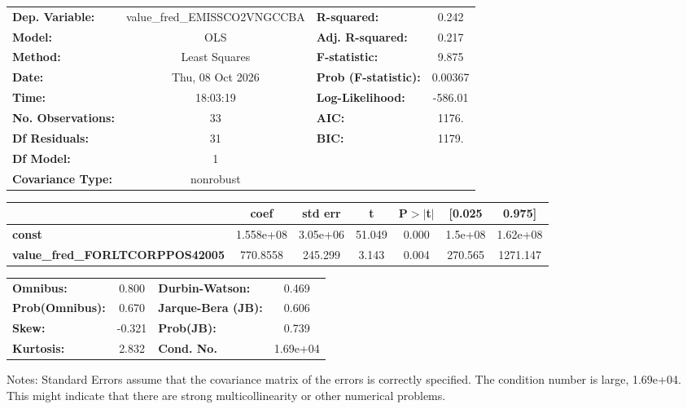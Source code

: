 \begin{center}
\begin{tabular}{lclc}
\toprule
\textbf{Dep. Variable:}                 & value\_fred\_EMISSCO2VNGCCBA & \textbf{  R-squared:         } &     0.242   \\
\textbf{Model:}                         &             OLS              & \textbf{  Adj. R-squared:    } &     0.217   \\
\textbf{Method:}                        &        Least Squares         & \textbf{  F-statistic:       } &     9.875   \\
\textbf{Date:}                          &       Thu, 08 Oct 2026       & \textbf{  Prob (F-statistic):} &  0.00367    \\
\textbf{Time:}                          &           18:03:19           & \textbf{  Log-Likelihood:    } &   -586.01   \\
\textbf{No. Observations:}              &                33            & \textbf{  AIC:               } &     1176.   \\
\textbf{Df Residuals:}                  &                31            & \textbf{  BIC:               } &     1179.   \\
\textbf{Df Model:}                      &                 1            & \textbf{                     } &             \\
\textbf{Covariance Type:}               &          nonrobust           & \textbf{                     } &             \\
\bottomrule
\end{tabular}
\begin{tabular}{lcccccc}
                                        & \textbf{coef} & \textbf{std err} & \textbf{t} & \textbf{P$> |$t$|$} & \textbf{[0.025} & \textbf{0.975]}  \\
\midrule
\textbf{const}                          &    1.558e+08  &     3.05e+06     &    51.049  &         0.000        &      1.5e+08    &     1.62e+08     \\
\textbf{value\_fred\_FORLTCORPPOS42005} &     770.8558  &      245.299     &     3.143  &         0.004        &      270.565    &     1271.147     \\
\bottomrule
\end{tabular}
\begin{tabular}{lclc}
\textbf{Omnibus:}       &  0.800 & \textbf{  Durbin-Watson:     } &    0.469  \\
\textbf{Prob(Omnibus):} &  0.670 & \textbf{  Jarque-Bera (JB):  } &    0.606  \\
\textbf{Skew:}          & -0.321 & \textbf{  Prob(JB):          } &    0.739  \\
\textbf{Kurtosis:}      &  2.832 & \textbf{  Cond. No.          } & 1.69e+04  \\
\bottomrule
\end{tabular}
\end{center}

Notes: \newline
 [1] Standard Errors assume that the covariance matrix of the errors is correctly specified. \newline
 [2] The condition number is large, 1.69e+04. This might indicate that there are \newline
 strong multicollinearity or other numerical problems.